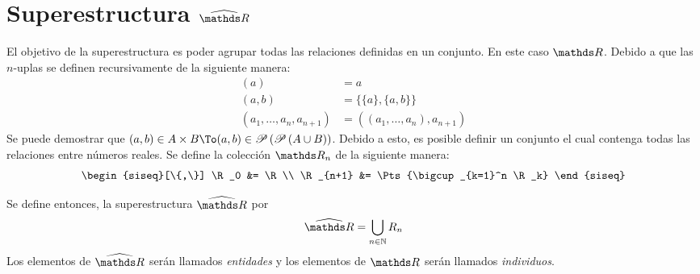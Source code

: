 \section{Superestructura \texorpdfstring{$\Rh$}{R}}

El objetivo de la superestructura es poder agrupar todas las relaciones
definidas en un conjunto. En este caso $\R$. Debido a que las
$n$-uplas se definen recursivamente de la siguiente manera:
\begin{align*}
  (a) &= a\\
  (a,b) &= \{\{a\}, \{a,b\}\}\\
  (a_1, \dots, a_n, a_{n+1}) &= ((a_1, \dots, a_n), a_{n+1})
\end{align*}
Se puede demostrar que $(a,b) \in A\times B \To
(a,b) \in \Pts{\Pts{A \cup B}}$. Debido a esto, es posible definir un
conjunto el cual contenga todas las relaciones entre números reales. Se
define la colección $\R_n$ de la siguiente manera:
\[
  \begin{siseq}[\{,\}]
    \R_0 &= \R\\
    \R_{n+1} &= \Pts{\bigcup_{k=1}^n \R_k}
  \end{siseq}
\]

Se define entonces, la superestructura $\Rh$ por
\[\Rh = \bigcup_{n\in\N} R_n\]
Los elementos de $\Rh$ serán llamados \emph{entidades} y los elementos
de $\R$ serán llamados \emph{individuos}.

